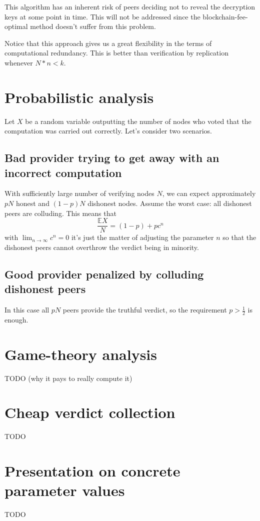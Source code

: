 \documentclass[12pt]{article}
\begin{document}
This algorithm has an inherent risk of peers deciding not to reveal the decryption keys at some point in time. 
This will not be addressed since the blockchain-fee-optimal method doesn't suffer from this problem.

Notice that this approach gives us a great flexibility in the terms of computational redundancy. This is better than verification by replication whenever $N * n < k$.

\section{Probabilistic analysis}
Let $X$ be a random variable outputting the number of nodes who voted that the computation was carried out correctly.
Let's consider two scenarios. 
\subsection{Bad provider trying to get away with an incorrect computation}
With sufficiently large number of verifying nodes $N$, we can expect approximately $pN$ honest and $(1-p)N$ dishonest nodes. 
Assume the worst case: all dishonest peers are colluding. This means that 
\begin{equation}
\frac{\mathbb{E}X}{N} = (1-p) + pc^n
\end{equation}
with $\lim_{n\to\infty} c^n = 0$ it's just the matter of adjusting the parameter $n$ so that the dishonest peers cannot overthrow the verdict being in minority.

\subsection{Good provider penalized by colluding dishonest peers}
In this case all $pN$ peers provide the truthful verdict, so the requirement $p > \frac{1}{2}$ is enough.

\section{Game-theory analysis} 
TODO (why it pays to really compute it)

\section{Cheap verdict collection}
TODO
\section{Presentation on concrete parameter values}
TODO
\end{document}
